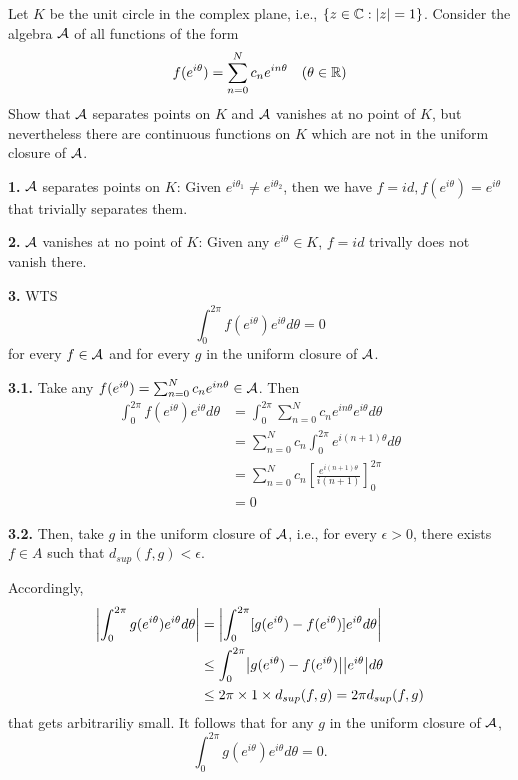 \documentclass[a4paper, 12pt]{article}
\begin{document}
\begin{problem} 
Let $K$ be the unit circle in the complex plane, i.e., $\{z \in \mathbb{C} : \lvert z\rvert = 1\}$. Consider the algebra $\mathcal{A}$ of all functions of the form \begin{equation*}
f(e^{i\theta}) = \sum_{n=0}^{N}c_n e^{in\theta} \quad (\theta \in \mathbb{R})
\end{equation*}
Show that $\mathcal{A}$ separates points on $K$ and $\mathcal{A}$ vanishes at no point of $K$, but nevertheless there are continuous functions on $K$ which are not in the uniform closure of $\mathcal{A}$.
\end{problem}
\begin{solution}
    \textbf{1.} $\mathcal{A}$ separates points on $K$: Given $e^{i\theta_1} \neq e^{i\theta_2}$, then we have $f = id, f(e^{i\theta}) = e^{i\theta}$ that trivially separates them.

    \textbf{2.} $\mathcal{A}$ vanishes at no point of $K$: Given any $e^{i\theta} \in K$, $f = id$ trivally does not vanish there.

    \textbf{3.} WTS \begin{equation*}
    \int_{0}^{2\pi} f(e^{i\theta}) e^{i\theta} d\theta = 0
    \end{equation*}
    for every $f \in \mathcal{A}$ and for every $g$ in the uniform closure of $\mathcal{A}$.

    \textbf{3.1.} Take any $f(e^{i\theta}) = \sum_{n=0}^{N}c_n e^{in\theta} \in \mathcal{A}$. Then \begin{align*}
        \int_{0}^{2\pi} f(e^{i\theta}) e^{i\theta} d\theta &= \int_{0}^{2\pi} \sum_{n=0}^{N}c_n e^{in\theta} e^{i\theta} d\theta \\
        &= \sum_{n=0}^{N} c_n \int_{0}^{2\pi} e^{i(n+1)\theta} d\theta\\
        &= \sum_{n=0}^{N} c_n \left[\frac{e^{i(n+1)\theta}}{i(n+1)}\right]^{2\pi}_0 \\
        &= 0
    \end{align*}

    \textbf{3.2.} Then, take $g$ in the uniform closure of $\mathcal{A}$, i.e., for every $\epsilon > 0$, there exists $f \in A$ such that $d_{sup}(f, g) < \epsilon$.

    Accordingly, \begin{align*}
        \abs*{\int_{0}^{2\pi} g(e^{i\theta}) e^{i\theta} d\theta} &= \abs*{\int_{0}^{2\pi}[g(e^{i\theta}) - f(e^{i\theta})] e^{i\theta} d\theta} \\
        &\leq \int_{0}^{2\pi} \abs*{g(e^{i\theta}) - f(e^{i\theta})} \abs*{e^{i\theta}} d\theta \\
        &\leq 2\pi \times 1 \times d_{sup}(f, g) = 2\pi d_{sup}(f, g)
    \end{align*}
    that gets arbitrariliy small. It follows that for any $g$ in the uniform closure of $\mathcal{A}$, \begin{equation*}
        \int_{0}^{2\pi} g(e^{i\theta}) e^{i\theta} d\theta = 0.
    \end{equation*}


\end{solution}
\end{document}
